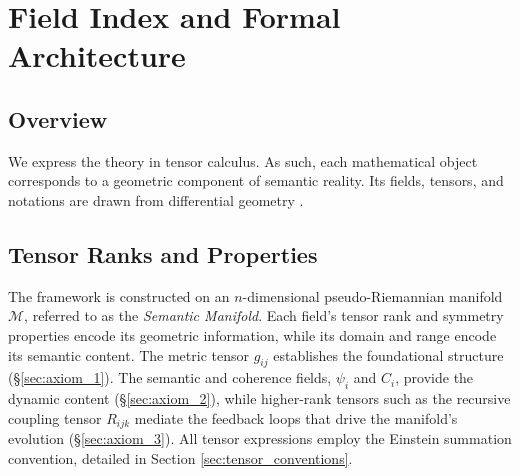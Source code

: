 \chapter{Field Index and Formal Architecture}
\label{ch:field_index_and_formal_architecture}


\section{Overview}

We express the theory in tensor calculus. As such, each mathematical object corresponds to a geometric component of semantic reality. Its fields, tensors, and notations are drawn from differential geometry \autocite{Riemann1868, Lee2003}.


\section{Tensor Ranks and Properties}
\label{sec:tensor_ranks_and_properties}

The framework is constructed on an \(n\)-dimensional pseudo-Riemannian manifold \(\mathcal{M}\), referred to as the \textit{Semantic Manifold}. Each field's tensor rank and symmetry properties encode its geometric information, while its domain and range encode its semantic content. The metric tensor \(g_{ij}\) establishes the foundational structure (\S\ref{sec:axiom_1}). The semantic and coherence fields, \(\psi_i\) and \(C_i\), provide the dynamic content (\S\ref{sec:axiom_2}), while higher-rank tensors such as the recursive coupling tensor \(R_{ijk}\) mediate the feedback loops that drive the manifold's evolution (\S\ref{sec:axiom_3}). All tensor expressions employ the Einstein summation convention, detailed in Section \ref{sec:tensor_conventions}.

